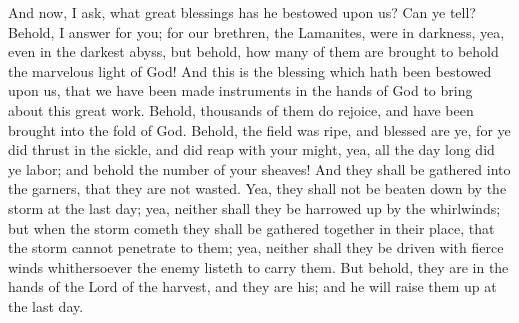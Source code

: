 \bverse \iffalse And now, I ask, what great blessings has he bestowed upon us?  Can ye tell? \fi
And now, I ask, what great blessings has he bestowed upon us?  Can ye tell?
\bverse \iffalse Behold, I answer for you; for our brethren, the Lamanites, were in darkness, yea, even in the darkest abyss, but behold, how many of them are brought to behold the marvelous light of God!  And this is the blessing which hath been bestowed upon us, that we have been made instruments in the hands of God to bring about this great work. \fi
Behold, I answer for you; for our brethren, the Lamanites, were in darkness, yea, even in the darkest abyss, but behold, how many of them are brought to behold the marvelous light of God!  And this is the blessing which hath been bestowed upon us, that we have been made instruments in the hands of God to bring about this great work.
\bverse \iffalse Behold, thousands of them do rejoice, and have been brought into the fold of God. \fi
Behold, thousands of them do rejoice, and have been brought into the fold of God.
\bverse \iffalse Behold, the field was ripe, and blessed are ye, for ye did thrust in the sickle, and did reap with your might, yea, all the day long did ye labor; and behold the number of your sheaves!  And they shall be gathered into the garners, that they are not wasted. \fi
Behold, the field was ripe, and blessed are ye, for ye did thrust in the sickle, and did reap with your might, yea, all the day long did ye labor; and behold the number of your sheaves!  And they shall be gathered into the garners, that they are not wasted.
\bverse \iffalse Yea, they shall not be beaten down by the storm at the last day; yea, neither shall they be harrowed up by the whirlwinds; but when the storm cometh they shall be gathered together in their place, that the storm cannot penetrate to them; yea, neither shall they be driven with fierce winds whithersoever the enemy listeth to carry them. \fi
Yea, they shall not be beaten down by the storm at the last day; yea, neither shall they be harrowed up by the whirlwinds; but when the storm cometh they shall be gathered together in their place, that the storm cannot penetrate to them; yea, neither shall they be driven with fierce winds whithersoever the enemy listeth to carry them.
\bverse \iffalse But behold, they are in the hands of the Lord of the harvest, and they are his; and he will raise them up at the last day. \fi
But behold, they are in the hands of the Lord of the harvest, and they are his; and he will raise them up at the last day.
